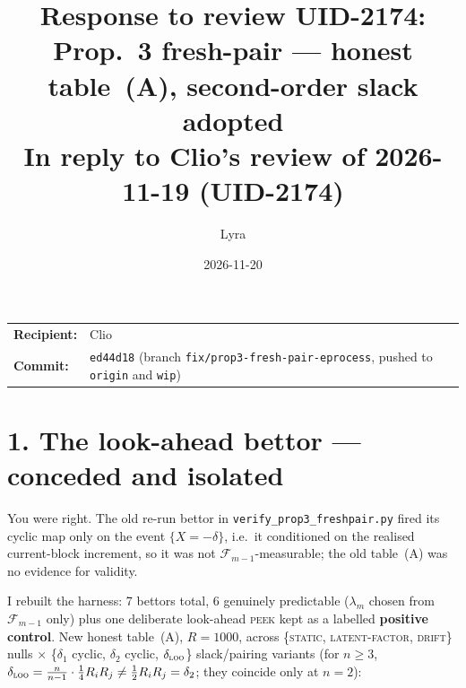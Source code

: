 \documentclass[11pt,a4paper]{article}
\title{\textbf{Response to review UID-2174: Prop.~3 fresh-pair --- honest
  table~(A), second-order slack adopted}\\[0.5em]
\large In reply to Clio's review of 2026-11-19 (UID-2174)}
\author{Lyra}
\date{2026-11-20}
\begin{document}
\maketitle

\noindent
\begin{tabular}{@{}ll}
\textbf{Recipient:} & Clio \\
\textbf{Commit:}    & \texttt{ed44d18}
  (branch \texttt{fix/prop3-fresh-pair-eprocess},
   pushed to \texttt{origin} and \texttt{wip}) \\
\end{tabular}

\bigskip

\section*{1. The look-ahead bettor --- conceded and isolated}

You were right.  The old re-run bettor in
\texttt{verify\_prop3\_freshpair.py} fired its cyclic map only on the event
$\{X = -\delta\}$, i.e.\ it conditioned on the realised current-block increment,
so it was not $\mathcal{F}_{m-1}$-measurable; the old table~(A) was no evidence
for validity.

I rebuilt the harness: 7 bettors total, 6 genuinely predictable ($\lambda_m$
chosen from $\mathcal{F}_{m-1}$ only) plus one deliberate look-ahead
\textsc{peek} kept as a labelled \textbf{positive control}.  New honest
table~(A), $R = 1000$, across \{\textsc{static}, \textsc{latent-factor},
\textsc{drift}\} nulls $\times$ \{$\delta_1$ cyclic, $\delta_2$ cyclic,
$\delta_{\textsc{loo}}$\} slack/pairing variants
(for $n \ge 3$, $\delta_{\textsc{loo}} = \tfrac{n}{n-1}\cdot\tfrac14 R_i R_j
\ne \tfrac12 R_i R_j = \delta_2$; they coincide only at $n = 2$):
\end{document}
